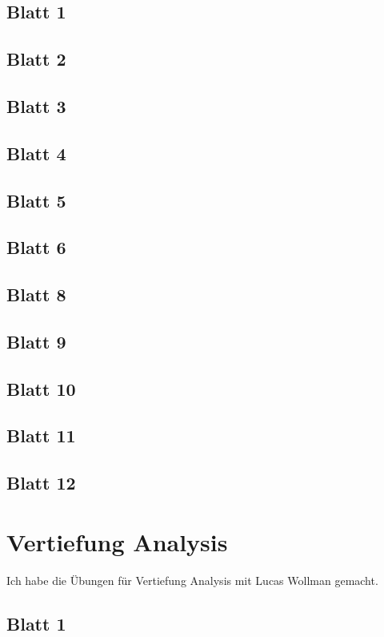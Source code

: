 \documentclass{tuftebook}
\numberwithin{Theorem}{chapter}
\theoremstyle{definition}
\theoremstyle{definition}
\begin{document}
\section{Blatt 1}

\section{Blatt 2}

\section{Blatt 3}

\section{Blatt 4}

\section{Blatt 5}

\section{Blatt 6}

\section{Blatt 8}

\section{Blatt 9}

\section{Blatt 10}

\section{Blatt 11}

\section{Blatt 12}


\chapter{Vertiefung Analysis}
Ich habe die Übungen für Vertiefung Analysis mit Lucas Wollman gemacht.
\section{Blatt 1}

\end{document}

